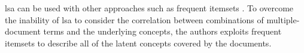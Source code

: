 \ac{lsa} can be used with other approaches such as frequent itemsets \citep{19-cagliero-al}. 
To overcome the inability of \ac{lsa} to consider the correlation between combinations of multiple-document
terms and the underlying concepts, the authors exploits frequent itemsets to describe all of the latent concepts covered by the documents.


%


